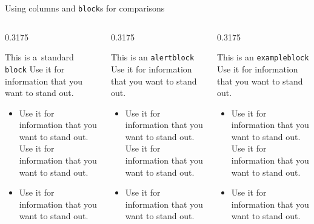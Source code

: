 \documentclass[aspectratio = 169, t, 10pt]{beamer}
\begin{document}
\begin{frame}{Using columns and \texttt{block}s for comparisons}
\vspace{-\baselineskip}%
\begin{columns}[onlytextwidth, t]
	\begin{column}{0.3175\textwidth}
		\begin{block}{This is a~standard \texttt{block}}
			Use it for information that you want to stand out.
			\begin{itemize}
				\itemsep = 0pt
				\item Use it for information that you want to stand out. Use it for information that you want to stand out.
				\item Use it for information that you want to stand out.
			\end{itemize}
		\end{block}
	\end{column}
	\begin{column}{0.3175\textwidth}
		\begin{alertblock}{This is an \texttt{alertblock}}
			Use it for information that you want to stand out.
			\begin{itemize}
				\itemsep = 0pt
				\item Use it for information that you want to stand out. Use it for information that you want to stand out.
				\item Use it for information that you want to stand out.
			\end{itemize}
		\end{alertblock}
	\end{column}
	\begin{column}{0.3175\textwidth}
		\begin{exampleblock}{This is an \texttt{exampleblock}}
			Use it for information that you want to stand out.
			\begin{itemize}
				\itemsep = 0pt
				\item Use it for information that you want to stand out. Use it for information that you want to stand out.
				\item Use it for information that you want to stand out.
			\end{itemize}
		\end{exampleblock}
	\end{column}
\end{columns}

\end{frame}
\end{document}
